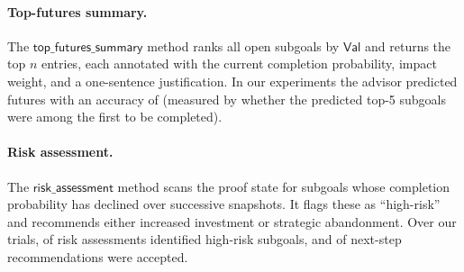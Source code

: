 \documentclass[11pt]{article}
\newcommand{\Valuation}{\mathsf{Val}}
\begin{document}
\paragraph{Top-futures summary.}
The $\mathsf{top\_futures\_summary}$ method ranks all open
subgoals by $\Valuation$ and returns the top $n$ entries,
each annotated with the current completion probability, impact
weight, and a one-sentence justification.  In our experiments
the advisor predicted \ppXCIfuturesPredicted{} futures with an
accuracy of \ppXCIfuturesAccuracy{} (measured by whether the
predicted top-5 subgoals were among the first to be completed).

\paragraph{Risk assessment.}
The $\mathsf{risk\_assessment}$ method scans the proof state for
subgoals whose completion probability has declined over
successive snapshots.  It flags these as ``high-risk'' and
recommends either increased investment or strategic abandonment.
Over our trials, \ppXCIhighRiskFlagged{} of
\ppXCIriskAssessments{} risk assessments identified high-risk
subgoals, and \ppXCInextStepAccepted{} of next-step
recommendations were accepted.

\end{document}
